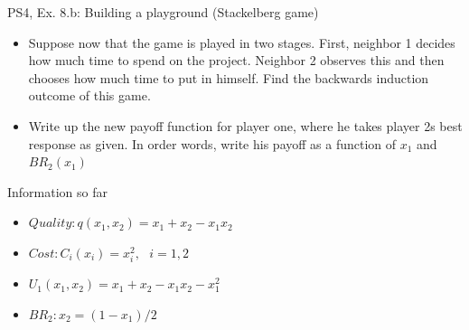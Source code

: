 \begin{frame}{PS4, Ex. 8.b: Building a playground (Stackelberg game)}
    \begin{itemize}
    \item[(b)] Suppose now that the game is played in two stages. First, neighbor 1 decides how much time to spend on the project. Neighbor 2 observes this and then chooses how much time to put in himself. Find the backwards induction outcome of this game.
    \end{itemize}
    \vfill\null
  \begin{multicols}{2}
    \begin{itemize}
      \item[(Step 1)] Write up the new payoff function for player one, where he takes player 2s best response as given. In order words, write his payoff as a function of \begin{math}x_1\end{math} and \begin{math}BR_2(x_1)\end{math}
    \end{itemize}
    \vfill\null \columnbreak
    Information so far
    \begin{itemize}
      \item[1] \begin{math}Quality: q(x_1,x_2)=x_1+x_2-x_1x_2 \end{math}
      \item[2] \begin{math}Cost: C_i(x_i)=x_i^2,\ \ \ i=1,2  \end{math}
      \item[3] \begin{math}U_1(x_1,x_2)=x_1+x_2-x_1x_2-x_1^2 \end{math}
      \item[4] \begin{math}BR_2: x_2=(1-x_1)/2 \end{math}
    \end{itemize}
    \vfill\null
  \end{multicols}
\end{frame}
